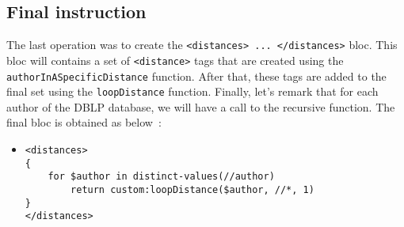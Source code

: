 \documentclass{article}
\begin{document}
  \subsection{Final instruction}
  The last operation was to create the \verb|<distances> ... </distances>| bloc. This bloc will contains a set of \verb|<distance>| tags that are created using the \verb|authorInASpecificDistance| function. After that, these tags are added to the final set using the \verb|loopDistance| function. Finally, let's remark that for each author of the DBLP database, we will have a call to the recursive function. The final bloc is obtained as below~:
    \begin{itemize}
      \item \begin{verbatim}
<distances>
{
    for $author in distinct-values(//author)
        return custom:loopDistance($author, //*, 1)
}
</distances>\end{verbatim}
    \end{itemize}
\end{document}
